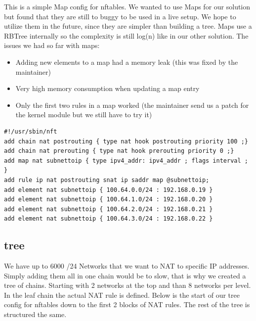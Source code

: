 \documentclass{report}
\begin{document}
This is a simple Map config for nftables. We wanted to use Maps for our
solution but found that they are still to buggy to be used in a live setup.
We hope to utilize them in the future, since they are simpler than building
a tree. Maps use a RBTree internally so the complexity is still
log(n) like in our other solution. The issues we had so far with maps:

\begin{itemize}
\itemsep1pt\parskip0pt
\item
  Adding new elements to a map had a memory leak (this was fixed by the
  maintainer)
\item
  Very high memory consumption when updating a map entry
\item
  Only the first two rules in a map worked (the maintainer send us a
  patch for the kernel module but we still have to try it)
\end{itemize}

\begingroup
\fontsize{9pt}{9pt}\selectfont
\begin{verbatim}
#!/usr/sbin/nft
add chain nat postrouting { type nat hook postrouting priority 100 ;}
add chain nat prerouting { type nat hook prerouting priority 0 ;}
add map nat subnettoip { type ipv4_addr: ipv4_addr ; flags interval ; }
add rule ip nat postrouting snat ip saddr map @subnettoip;
add element nat subnettoip { 100.64.0.0/24 : 192.168.0.19 }
add element nat subnettoip { 100.64.1.0/24 : 192.168.0.20 }
add element nat subnettoip { 100.64.2.0/24 : 192.168.0.21 }
add element nat subnettoip { 100.64.3.0/24 : 192.168.0.22 }
\end{verbatim}
\endgroup

\subsection{tree}

We have up to 6000 /24 Networks that we want to NAT to specific IP addresses.
Simply adding them all in one chain would be to slow, that is why we
created a tree of chains. Starting with 2 networks at the top and than 8
networks per level. In the leaf chain the actual NAT rule is defined.
Below is the start of our tree config for nftables down to the first 2
blocks of NAT rules. The rest of the tree is structured the same.
\end{document}
